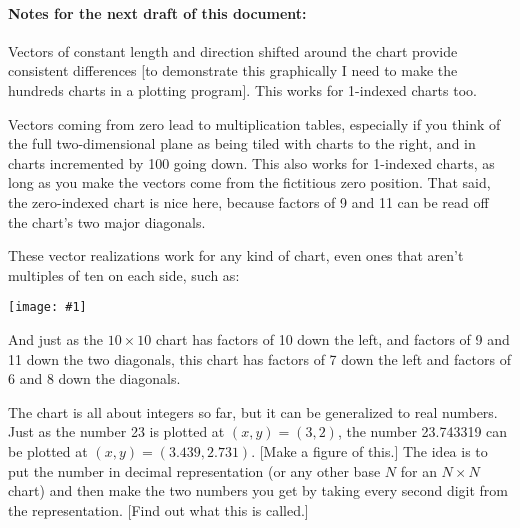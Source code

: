 \documentclass[12pt]{article}
\newcommand{\showchart}[1]{\texttt{[image: \#1]}}
\begin{document}
\paragraph{Notes for the next draft of this document:}
Vectors of constant length and direction shifted around the chart
provide consistent differences [to demonstrate this graphically I need
  to make the hundreds charts in a plotting program].  This works for
1-indexed charts too.

Vectors coming from zero lead to multiplication tables, especially if
you think of the full two-dimensional plane as being tiled with charts
to the right, and in charts incremented by 100 going down.  This also
works for 1-indexed charts, as long as you make the vectors come from
the fictitious zero position.  That said, the zero-indexed chart is
nice here, because factors of 9 and 11 can be read off the chart's two
major diagonals.

These vector realizations work for any kind of chart, even ones that
aren't multiples of ten on each side, such as:
\begin{center}
\showchart{hundreds_chart_7x7_base10.pdf}
\end{center}
And just as the $10\times 10$ chart has factors of 10 down the left,
and factors of 9 and 11 down the two diagonals, this chart has factors
of 7 down the left and factors of 6 and 8 down the diagonals.

The chart is all about integers so far, but it can be generalized to
real numbers.  Just as the number 23 is plotted at $(x,y) = (3,2)$,
the number 23.743319 can be plotted at $(x,y) = (3.439, 2.731)$.
[Make a figure of this.]  The idea is to put the number in decimal
representation (or any other base $N$ for an $N\times N$ chart) and
then make the two numbers you get by taking every second digit from
the representation.  [Find out what this is called.]
\end{document}
